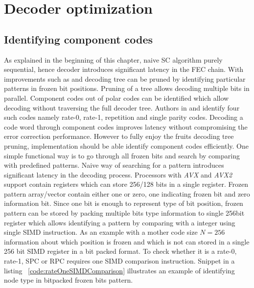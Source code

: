 \section{Decoder optimization}

\subsection{Identifying component codes}
As explained in the beginning of this chapter, naive SC algorithm purely sequential, hence decoder introduces significant latency in the FEC chain. With improvements such as \cite{fastSSC} and \cite{SSC} decoding tree can be pruned by identifying particular patterns in frozen bit positions. Pruning of a tree allows decoding multiple bits in parallel. Component codes out of polar codes can be identified which allow decoding without traversing the full decoder tree. Authors in \cite{SSC} and \cite{fastSSC} identify four such codes namely rate-0, rate-1, repetition and single parity codes. Decoding a code word through component codes improves latency without compromising the error correction performance. However to fully enjoy the fruits decoding tree pruning, implementation should be able identify component codes efficiently. One simple functional way is to go through all frozen bits and search by comparing with predefined patterns. Naive way of searching for a pattern introduces significant latency in the decoding process. Processors with \textit{AVX} and \textit{AVX2} support contain registers which can store 256/128 bits in a single register. Frozen pattern array/vector contain either one or zero, one indicating frozen bit and zero information bit. Since one bit is enough to represent type of bit position, frozen pattern can be stored by packing multiple bits type information to single 256bit register which allows identifying a pattern by comparing with a integer using single SIMD instruction. As an example with a mother code size $N=256$ information about which position is frozen and which is not can stored in a single 256 bit SIMD register in a bit packed format. To check whether it is a rate-0, rate-1, SPC or RPC requires one SIMD comparison instruction. Snippet in a listing ~\ref{code:rateOneSIMDComparison} illustrates an example of identifying node type in bitpacked frozen bits pattern.

